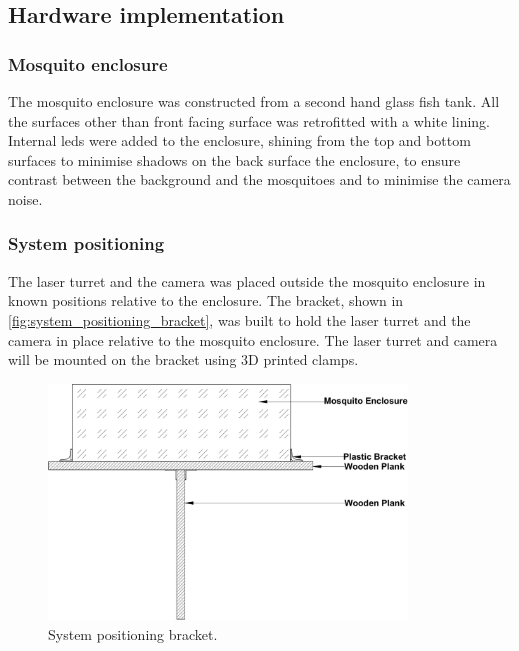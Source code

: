 \FloatBarrier
\subsection{Hardware implementation}\label{subsec:hardware_implementation}
\subsubsection{Mosquito enclosure}
\newcommand{\enclosureHeightCM}{38} %
The mosquito enclosure was constructed from a second hand glass fish tank. All the surfaces other than front facing surface was retrofitted with a white lining. Internal \glspl{led} were added to the enclosure, shining from the top and bottom surfaces to minimise shadows on the back surface the enclosure, to ensure contrast between the background and the mosquitoes and to minimise the camera noise.



\subsubsection{System positioning}\label{subsubsec:system_positioning}
The laser turret and the camera was placed outside the mosquito enclosure in known positions relative to the enclosure. The bracket, shown in \autoref{fig:system_positioning_bracket}, was built to hold the laser turret and the camera in place relative to the mosquito enclosure. The laser turret and camera will be mounted on the bracket using 3D printed clamps.
\begin{figure}[!htb]
  \centering
  \includegraphics[width=0.85\textwidth]{figures/hardware_design/system_positioning.pdf}
  \caption{System positioning bracket.}
  \label{fig:system_positioning_bracket}
\end{figure}


